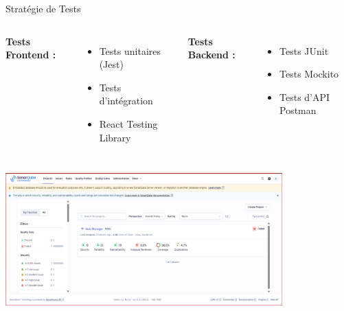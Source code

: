 \documentclass[aspectratio=169]{beamer}
\begin{document}
\begin{frame}{Stratégie de Tests}
    \begin{columns}
        \textbf{Tests Frontend :}
        \begin{itemize}
            \item Tests unitaires (Jest)
            \item Tests d'intégration
            \item React Testing Library
        \end{itemize}

        \textbf{Tests Backend :}
        \begin{itemize}
            \item Tests JUnit
            \item Tests Mockito
            \item Tests d'API Postman
        \end{itemize}
    \end{columns}

    \vspace{1cm}
    \begin{center}
        \includegraphics[width=0.8\textwidth]{latex_media/media/Analyse de code avec SonarQube.png}
    \end{center}
\end{frame}
\end{document}
